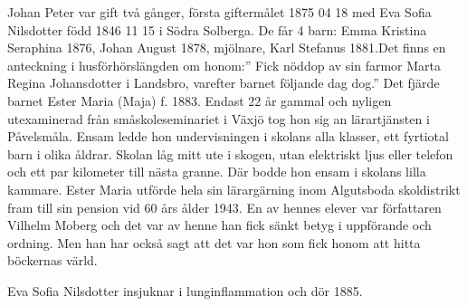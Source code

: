 Johan Peter var gift två gånger, första giftermålet 1875 04 18 med Eva Sofia Nilsdotter född 1846 11 15 i Södra Solberga. De får 4 barn: Emma Kristina Seraphina 1876, Johan August 1878, mjölnare,  Karl Stefanus 1881.Det finns en anteckning i husförhörslängden om honom:” Fick nöddop av sin farmor Marta Regina Johansdotter i Landsbro, varefter barnet följande dag dog.” Det fjärde barnet Ester Maria (Maja) f. 1883. Endast 22 år gammal och nyligen utexaminerad från småskoleseminariet i Växjö tog hon sig an lärartjänsten i Påvelsmåla. Ensam ledde hon undervisningen i skolans alla klasser, ett fyrtiotal barn i olika åldrar. Skolan låg mitt ute i skogen, utan elektriskt ljus eller telefon och ett par kilometer till nästa granne. Där bodde hon ensam i skolans lilla kammare. Ester Maria utförde hela sin lärargärning inom Algutsboda skoldistrikt fram till sin pension vid 60 års ålder 1943. En av hennes elever var författaren Vilhelm Moberg och det var av henne han fick sänkt betyg i uppförande och ordning. Men han har också sagt att det var hon som fick honom att hitta böckernas värld.


Eva Sofia Nilsdotter insjuknar i lunginflammation och dör 1885.


